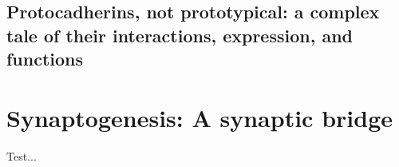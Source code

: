 \documentclass[11pt, a4paper, oneside]{article}   	%
\begin{document}
\subsection{Protocadherins, not prototypical: a complex tale of their interactions, expression, and functions}



\section{Synaptogenesis: A synaptic bridge \cite{Yates2016}}

Test...





\end{document}
